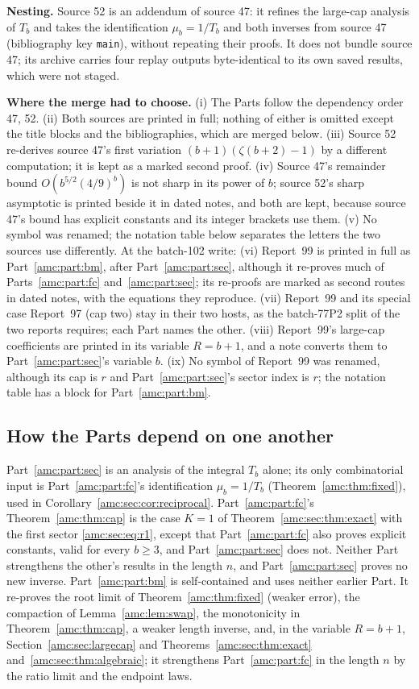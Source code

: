 \documentclass[11pt,letterpaper]{article}
\theoremstyle{remark}\newtheorem{remark}[theorem]{Remark}
\begin{document}
\noindent\textbf{Nesting.} Source 52 is an addendum of source 47: it refines the large-cap analysis of $T_b$ and takes the identification $\mu_b=1/T_b$ and both inverses from source 47 (bibliography key \texttt{main}), without repeating their proofs. It does not bundle source 47; its archive carries four replay outputs byte-identical to its own saved results, which were not staged.

\noindent\textbf{Where the merge had to choose.} (i) The Parts follow the dependency order 47, 52. (ii) Both sources are printed in full; nothing of either is omitted except the title blocks and the bibliographies, which are merged below. (iii) Source 52 re-derives source 47's first variation $(b+1)(\zeta(b+2)-1)$ by a different computation; it is kept as a marked second proof. (iv) Source 47's remainder bound $O(b^{5/2}(4/9)^b)$ is not sharp in its power of $b$; source 52's sharp asymptotic is printed beside it in dated notes, and both are kept, because source 47's bound has explicit constants and its integer brackets use them. (v) No symbol was renamed; the notation table below separates the letters the two sources use differently. At the batch-102 write: (vi) Report~99 is printed in full as Part~\ref{amc:part:bm}, after Part~\ref{amc:part:sec}, although it re-proves much of Parts~\ref{amc:part:fc} and~\ref{amc:part:sec}; its re-proofs are marked as second routes in dated notes, with the equations they reproduce. (vii) Report~99 and its special case Report~97 (cap two) stay in their two hosts, as the batch-77P2 split of the two reports requires; each Part names the other. (viii) Report~99's large-cap coefficients are printed in its variable $R=b+1$, and a note converts them to Part~\ref{amc:part:sec}'s variable $b$. (ix) No symbol of Report~99 was renamed, although its cap is $r$ and Part~\ref{amc:part:sec}'s sector index is $r$; the notation table has a block for Part~\ref{amc:part:bm}.

\subsection*{How the Parts depend on one another}
\label{amc:guide:dependencies}
Part~\ref{amc:part:sec} is an analysis of the integral $T_b$ alone; its only combinatorial input is Part~\ref{amc:part:fc}'s identification $\mu_b=1/T_b$ (Theorem~\ref{amc:thm:fixed}), used in Corollary~\ref{amc:sec:cor:reciprocal}. Part~\ref{amc:part:fc}'s Theorem~\ref{amc:thm:cap} is the case $K=1$ of Theorem~\ref{amc:sec:thm:exact} with the first sector \eqref{amc:sec:eq:r1}, except that Part~\ref{amc:part:fc} also proves explicit constants, valid for every $b\ge3$, and Part~\ref{amc:part:sec} does not. Neither Part strengthens the other's results in the length $n$, and Part~\ref{amc:part:sec} proves no new inverse. Part~\ref{amc:part:bm} is self-contained and uses neither earlier Part. It re-proves the root limit of Theorem~\ref{amc:thm:fixed} (weaker error), the compaction of Lemma~\ref{amc:lem:swap}, the monotonicity in Theorem~\ref{amc:thm:cap}, a weaker length inverse, and, in the variable $R=b+1$, Section~\ref{amc:sec:largecap} and Theorems~\ref{amc:sec:thm:exact} and~\ref{amc:sec:thm:algebraic}; it strengthens Part~\ref{amc:part:fc} in the length $n$ by the ratio limit and the endpoint laws.
\end{document}
